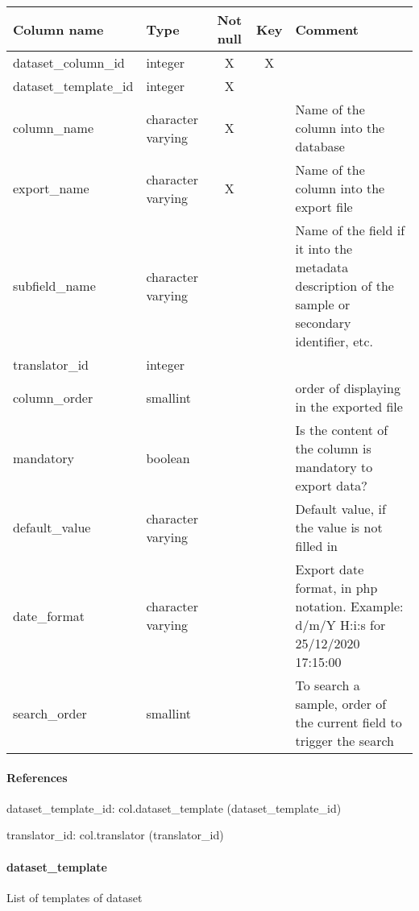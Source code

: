\begin{tabular}{|l| p{2cm}|c|c| p{5cm}|}
\hline
Column name & Type & Not null & Key & Comment \\
\hline
dataset\_column\_id & integer & X & X & \\
dataset\_template\_id & integer & X &  & \\
column\_name & character varying & X &  & Name of the column into the database\\
export\_name & character varying & X &  & Name of the column into the export file\\
subfield\_name & character varying &  &  & Name of the field if it into the metadata description of the sample or secondary identifier, etc.\\
translator\_id & integer &  &  & \\
column\_order & smallint &  &  & order of displaying in the exported file\\
mandatory & boolean &  &  & Is the content of the column is mandatory to export data?\\
default\_value & character varying &  &  & Default value, if the value is not filled in\\
date\_format & character varying &  &  & Export date format, in php notation. Example: d/m/Y H:i:s for 25/12/2020 17:15:00\\
search\_order & smallint &  &  & To search a sample, order of the current field to trigger the search\\
\hline
\end{tabular}
\paragraph{References}
dataset\_template\_id: col.dataset\_template (dataset\_template\_id)

translator\_id: col.translator (translator\_id)

\paragraph{dataset\_template}
List of templates of dataset

